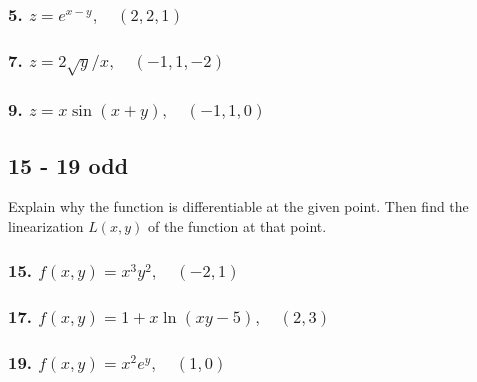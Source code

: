 \documentclass{article}
\begin{document}
\subsubsection*{5. $z = e^{x-y},\quad (2,2,1)$}
\subsubsection*{7. $z = 2\sqrt y / x,\quad (-1,1,-2)$}
\subsubsection*{9. $z = x\sin (x+y),\quad (-1, 1, 0)$}
\subsection*{15 - 19 odd}
Explain why the function is differentiable at the given point. Then find the linearization $L(x,y)$ of the function at that point.
\subsubsection*{15. $f(x,y) = x^3y^2,\quad (-2,1)$}
\subsubsection*{17. $f(x,y) = 1 + x\ln (xy-5),\quad (2,3)$}
\subsubsection*{19. $f(x,y) = x^2e^y,\quad (1,0)$}
\end{document}
